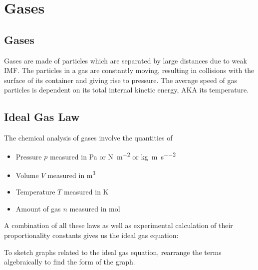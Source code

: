 \documentclass[../main]{subfiles}
\begin{document}
\section{Gases}

	\subsection{Gases}

	Gases are made of particles which are separated by large distances due to weak IMF. The particles in a gas are constantly moving, resulting in collisions with the surface of its container and giving rise to pressure. The average speed of gas particles is dependent on its total internal kinetic energy, AKA its temperature.

	\subsection{Ideal Gas Law}

	The chemical analysis of gases involve the quantities of 

	\begin{itemize}
		\item Pressure \(p\) measured in \si{\Pa} or \si{\N\per\m\squared} or \si{\kg\per\meter\per\s\squared}
		\item Volume \(V\) measured in \si{\m\cubed}
		\item Temperature \(T\) measured in \si{\K}
		\item Amount of gas \(n\) measured in \si{\mol}
	\end{itemize}





	A combination of all these laws as well as experimental calculation of their proportionality constants gives us the ideal gas equation:


	To sketch graphs related to the ideal gas equation, rearrange the terms algebraically to find the form of the graph.
\end{document}
